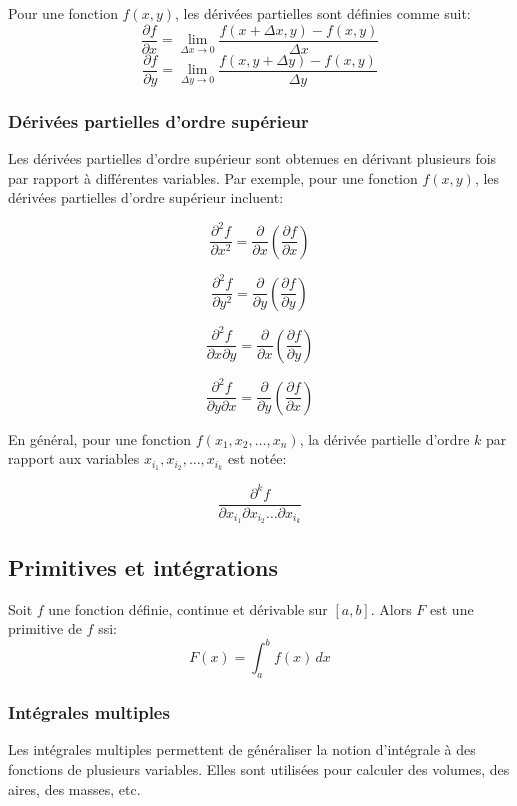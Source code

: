 Pour une fonction $f(x, y)$, les dérivées partielles sont définies comme suit:
$$
\frac{\partial f}{\partial x} = \lim_{\Delta x \to 0} \frac{f(x + \Delta x, y) - f(x, y)}{\Delta x}
$$
$$
\frac{\partial f}{\partial y} = \lim_{\Delta y \to 0} \frac{f(x, y + \Delta y) - f(x, y)}{\Delta y}
$$



\subsubsection{Dérivées partielles d'ordre supérieur}

Les dérivées partielles d'ordre supérieur sont obtenues en dérivant plusieurs fois par rapport à différentes variables. Par exemple, pour une fonction $f(x, y)$, les dérivées partielles d'ordre supérieur incluent:

$$
\frac{\partial^2 f}{\partial x^2} = \frac{\partial}{\partial x} \left( \frac{\partial f}{\partial x} \right)
$$

$$
\frac{\partial^2 f}{\partial y^2} = \frac{\partial}{\partial y} \left( \frac{\partial f}{\partial y} \right)
$$

$$
\frac{\partial^2 f}{\partial x \partial y} = \frac{\partial}{\partial x} \left( \frac{\partial f}{\partial y} \right)
$$

$$
\frac{\partial^2 f}{\partial y \partial x} = \frac{\partial}{\partial y} \left( \frac{\partial f}{\partial x} \right)
$$

En général, pour une fonction $f(x_1, x_2, \ldots, x_n)$, la dérivée partielle d'ordre $k$ par rapport aux variables $x_{i_1}, x_{i_2}, \ldots, x_{i_k}$ est notée:

$$
\frac{\partial^k f}{\partial x_{i_1} \partial x_{i_2} \ldots \partial x_{i_k}}
$$


\subsection{Primitives et intégrations}

Soit $f$ une fonction définie, continue et dérivable sur $[a,b]$. Alors $F$ est une primitive de $f$ ssi:
$$
    F(x) =  \int_{a}^{b} f(x) \,dx 
$$


\subsubsection{Intégrales multiples}

Les intégrales multiples permettent de généraliser la notion d'intégrale à des fonctions de plusieurs variables. Elles sont utilisées pour calculer des volumes, des aires, des masses, etc.

